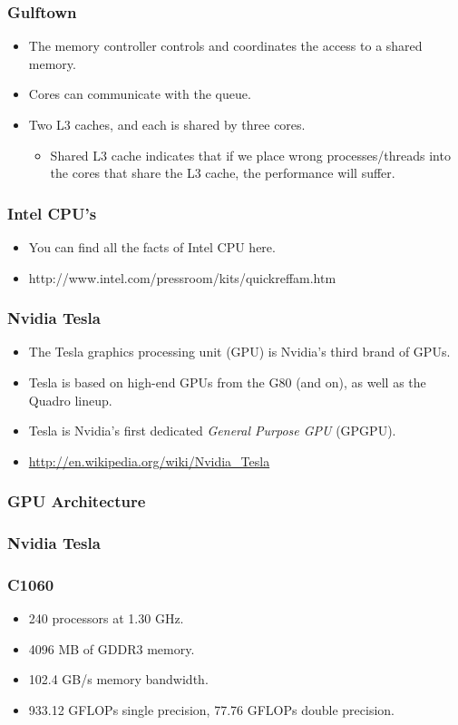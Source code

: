 \documentclass{beamer}
\begin{document}
\begin{CJK}{UTF8}{bsmi}
\begin{frame}
\frametitle{Gulftown}
\begin{itemize}
\item The memory controller controls and coordinates the access to a
  shared memory.
\item Cores can communicate with the queue.  
\item Two L3 caches, and each is shared by three cores.  
  \begin{itemize}
    \item Shared L3 cache indicates that if we place wrong
      processes/threads into the cores that share the L3 cache, the
      performance will suffer.
  \end{itemize}
\end{itemize}
\end{frame}

\begin{frame}
\frametitle{Intel CPU's}
\begin{itemize}
\item You can find all the facts of Intel CPU here.
\item http://www.intel.com/pressroom/kits/quickreffam.htm
\end{itemize}
\end{frame}

\begin{frame}
\frametitle{Nvidia Tesla}
\begin{itemize}
\item The Tesla graphics processing unit (GPU) is Nvidia's third brand
  of GPUs. 
\item Tesla is based on high-end GPUs from the G80 (and on), as well
  as the Quadro lineup.
\item Tesla is Nvidia's first dedicated {\em General Purpose GPU}
  (GPGPU).
\item \url{http://en.wikipedia.org/wiki/Nvidia_Tesla}
\end{itemize}
\end{frame}

\begin{frame}
\frametitle{GPU Architecture}
\centerline{}
\end{frame}

\begin{frame}
\frametitle{Nvidia Tesla}
\centerline{}
\end{frame}

\begin{frame}
\frametitle{C1060}
\begin{itemize}
\item 240 processors at 1.30 GHz.
\item 4096 MB of GDDR3 memory.
\item 102.4 GB/s memory bandwidth.
\item 933.12 GFLOPs single precision, 77.76 GFLOPs double precision.
\end{itemize}
\end{frame}


\end{CJK}
\end{document}
